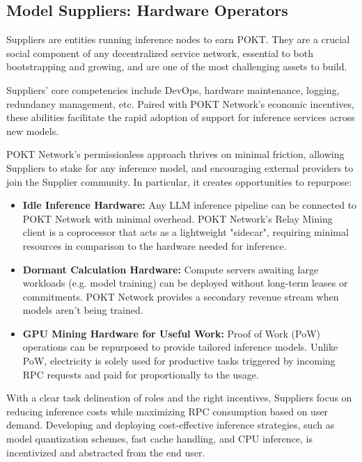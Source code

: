 \documentclass[conference,compsoc]{IEEEtran}
\begin{document}
\subsection{Model Suppliers: Hardware Operators}

Suppliers are entities running inference nodes to earn POKT. They are a crucial social component of any decentralized service network, essential to both bootstrapping and growing, and are one of the most challenging assets to build.

Suppliers' core competencies include DevOps, hardware maintenance, logging, redundancy management, etc. Paired with POKT Network’s economic incentives, these abilities facilitate the rapid adoption of support for inference services across new models.

POKT Network's permissionless approach thrives on minimal friction, allowing Suppliers to stake for any inference model, and encouraging external providers to join the Supplier community. In particular, it creates opportunities to repurpose:

\begin{itemize}
    \item \textbf{Idle Inference Hardware:} Any LLM inference pipeline can be connected to POKT Network with minimal overhead. POKT Network's Relay Mining client is a coprocessor \cite{coprocessor} that acts as a lightweight "sidecar", requiring minimal resources in comparison to the hardware needed for inference.
    \item \textbf{Dormant Calculation Hardware:} Compute servers awaiting large workloads (e.g. model training) can be deployed without long-term leases or commitments. POKT Network provides a secondary revenue stream when models aren't being trained.
    \item \textbf{GPU Mining Hardware for Useful Work:} Proof of Work (PoW) operations can be repurposed to provide tailored inference models. Unlike PoW, electricity is solely used for productive tasks triggered by incoming RPC requests and paid for proportionally to the usage.
\end{itemize}

With a clear task delineation of roles and the right incentives, Suppliers focus on reducing inference costs while maximizing RPC consumption based on user demand. Developing and deploying cost-effective inference strategies, such as model quantization schemes, fast cache handling, and CPU inference, is incentivized and abstracted from the end user.
\end{document}
